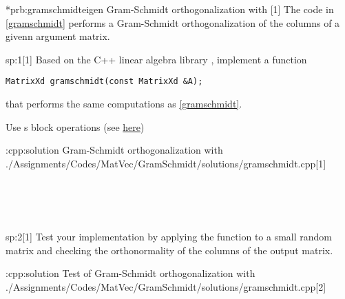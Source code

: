 \begin{samproblem}*{prb:gramschmidteigen}
        {Gram-Schmidt orthogonalization with \eigen{}}[1]{
The code in \cref{gramschmidt} performs a Gram-Schmidt
orthogonalization of the columns of a givenn argument matrix.
}

\begin{subproblem}{sp:1}[1]
  Based on the C++ linear algebra library \eigen{}, implement a function
  \begin{lstlisting}[style=cpp]
MatrixXd gramschmidt(const MatrixXd &A);
  \end{lstlisting}
  that performs the same computations as \cref{gramschmidt}.

  \begin{samhint}
    Use \eigen{}s block operations
    (see \href{https://eigen.tuxfamily.org/dox/group__TutorialBlockOperations.html}
    {here})
  \end{samhint}

  \begin{samsolution}
    \begin{samcode}[C++-code]{\cpl:cpp:solution}
        {Gram-Schmidt orthogonalization with \eigen{}}
        \samincludecpp
        {./Assignments/Codes/MatVec/GramSchmidt/solutions/gramschmidt.cpp}[1]
    \end{samcode}
         \\
         \\
         \\
  \end{samsolution}

\end{subproblem}

\begin{subproblem}{sp:2}[1]
  \label{sp:strassen:2}
  Test your implementation by applying the function 
  to a small random matrix
  and checking the orthonormality of the columns of the output
  matrix.

  \begin{samsolution}
    \begin{samcode}[C++-code]{\cpl:cpp:solution}
    {Test of Gram-Schmidt orthogonalization with \eigen{}}
      \samincludecpp
      {./Assignments/Codes/MatVec/GramSchmidt/solutions/gramschmidt.cpp}[2]
    \end{samcode}
  \end{samsolution}

\end{subproblem}

\end{samproblem}
